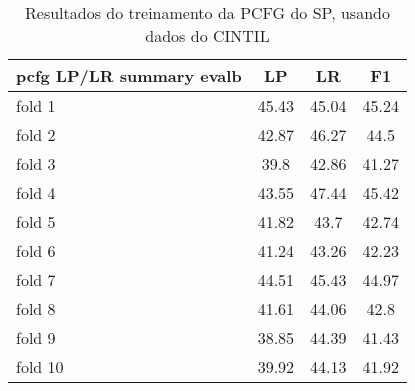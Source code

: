 \begin{table}[!h]
    \centering
    \begin{tabular}{|l|c|c|c|}
        \hline
        pcfg LP/LR summary evalb & LP & LR & F1\\
        \hline
        fold 1 & 45.43 & 45.04 & 45.24\\
        fold 2 & 42.87 & 46.27 & 44.5\\
        fold 3 & 39.8 & 42.86 & 41.27\\
        fold 4 & 43.55 & 47.44 & 45.42\\
        fold 5 & 41.82 & 43.7 & 42.74\\
        fold 6 & 41.24 & 43.26 & 42.23\\
        fold 7 & 44.51 & 45.43 & 44.97\\
        fold 8 & 41.61 & 44.06 & 42.8\\
        fold 9 & 38.85 & 44.39 & 41.43\\
        fold 10 & 39.92 & 44.13 & 41.92\\
        \hline
    \end{tabular}
    \caption{Resultados do treinamento da PCFG do SP, usando dados do CINTIL}
    \label{tab:result_cintil_pcfg}
\end{table}